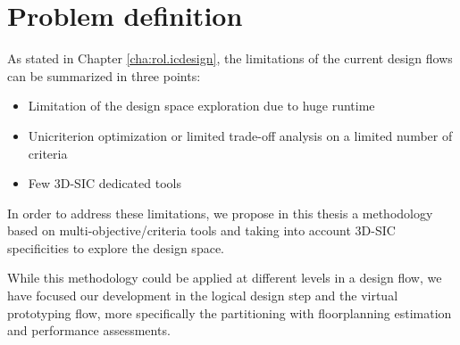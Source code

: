 \section{Problem definition}
As stated in Chapter \ref{cha:rol.icdesign}, the limitations of the current design flows can be summarized in three points:
\begin{itemize}
\item Limitation of the design space exploration due to huge runtime
\item Unicriterion optimization or limited trade-off analysis on a limited number of criteria
\item Few 3D-SIC dedicated tools
\end{itemize}
In order to address these limitations, we propose in this thesis a methodology based on multi-objective/criteria tools and taking into account 3D-SIC specificities to explore the design space.

While this methodology could be applied at different levels in a design flow, we have focused our development in the logical design step and the virtual prototyping flow, more specifically the partitioning with floorplanning estimation and performance assessments.


